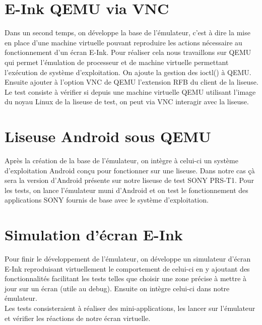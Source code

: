 \newpage

\section{E-Ink QEMU via VNC}

Dans un second temps, on développe la base de l'émulateur, c'est à dire la mise en place d'une machine virtuelle pouvant reproduire les actions nécessaire au fonctionnement d'un écran E-Ink. Pour réaliser cela nous travaillons sur QEMU qui permet l'émulation de processeur et de machine virtuelle permettant l'exécution de système d'exploitation. On ajoute la gestion des ioctl() à QEMU. Ensuite ajouter à l'option VNC de QEMU l'extension RFB du client de la liseuse.
\\Le test consiste à vérifier si depuis une machine virtuelle QEMU utilisant l'image du noyau Linux de la liseuse de test, on peut via VNC interagir avec la liseuse. 


\section{Liseuse Android sous QEMU}

Après la création de la base de l'émulateur, on intègre à celui-ci un système d'exploitation Android conçu pour fonctionner sur une liseuse. Dans notre cas çà sera la version d'Android présente sur notre liseuse de test SONY PRS-T1.
Pour les tests, on lance l'émulateur muni d'Android et on test le fonctionnement des applications SONY fournis de base avec le système d'exploitation.

\section{Simulation d'écran E-Ink}

Pour finir le développement de l'émulateur, on développe un simulateur d'écran E-Ink reproduisant virtuellement le comportement de celui-ci en y ajoutant des fonctionnalités facilitant les tests telles que choisir une zone précise à mettre à jour sur un écran (utile au debug). Ensuite on intègre celui-ci dans notre émulateur.
\\Les tests consisteraient à réaliser des mini-applications, les lancer sur l'émulateur et vérifier les réactions de notre écran virtuelle.

